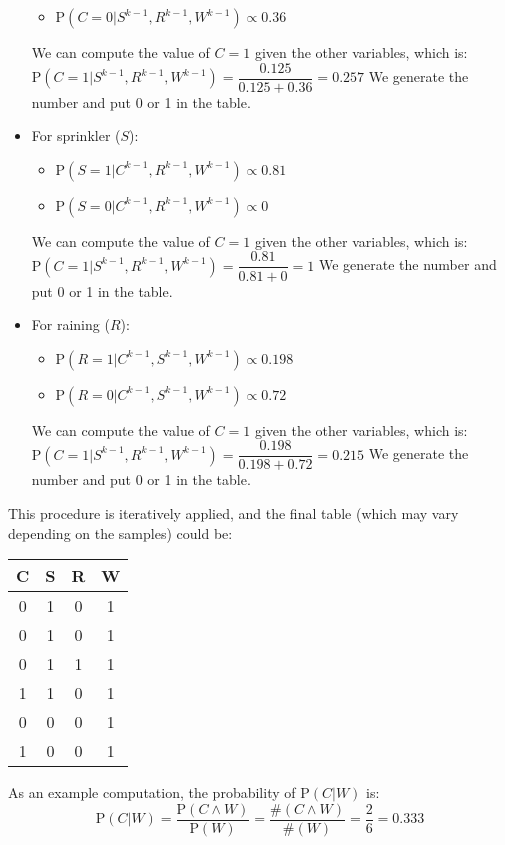 \begin{example}
\begin{itemize}
\begin{itemize}
                \item $\text{P}(C=0|S^{k-1},R^{k-1},W^{k-1}) \propto 0.36$
            \end{itemize}
            We can compute the value of $C=1$ given the other variables, which is: 
            $\text{P}(C=1|S^{k-1},R^{k-1},W^{k-1}) = \dfrac{0.125}{0.125+0.36}=0.257$
            We generate the number and put 0 or 1 in the table.
        \item For sprinkler ($S$):
            \begin{itemize}
                \item $\text{P}(S=1|C^{k-1},R^{k-1},W^{k-1}) \propto 0.81$
                \item $\text{P}(S=0|C^{k-1},R^{k-1},W^{k-1}) \propto 0$
            \end{itemize}
            We can compute the value of $C=1$ given the other variables, which is: 
            $\text{P}(C=1|S^{k-1},R^{k-1},W^{k-1}) = \dfrac{0.81}{0.81+0}=1$
            We generate the number and put 0 or 1 in the table. 
        \item For raining ($R$):
            \begin{itemize}
                \item $\text{P}(R=1|C^{k-1},S^{k-1},W^{k-1}) \propto 0.198$
                \item $\text{P}(R=0|C^{k-1},S^{k-1},W^{k-1}) \propto 0.72$
            \end{itemize}
            We can compute the value of $C=1$ given the other variables, which is: 
            $\text{P}(C=1|S^{k-1},R^{k-1},W^{k-1}) = \dfrac{0.198}{0.198+0.72}=0.215$
            We generate the number and put 0 or 1 in the table. 
    \end{itemize}
    This procedure is iteratively applied, and the final table (which may vary depending on the samples) could be:
    \begin{table}[H]
        \centering
        \begin{tabular}{cccc}
        \hline
        \textbf{C} & \textbf{S} & \textbf{R} & \textbf{W} \\ \hline
        0          & 1          & 0          & 1          \\
        0          & 1          & 0          & 1          \\
        0          & 1          & 1          & 1          \\
        1          & 1          & 0          & 1          \\
        0          & 0          & 0          & 1          \\
        1          & 0          & 0          & 1          \\ \hline
        \end{tabular}
    \end{table}
    As an example computation, the probability of $\text{P}(C|W)$ is:
    \[\text{P}(C|W)=\dfrac{\text{P}(C \land W)}{\text{P}(W)}=\dfrac{\# (C \land W)}{\#(W)}=\dfrac{2}{6}=0.333\]
\end{example}